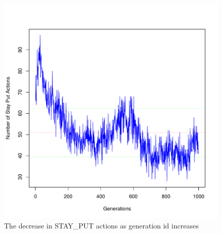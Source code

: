 \documentclass{article}
\begin{document}
\begin{figure}[h!]
\centering
\includegraphics[scale=0.56]{figure-4.pdf}
\caption{The decrease in STAY\_PUT actions as generation id increases}
\label{fig:stay-put-actions}
\end{figure}




\end{document}

